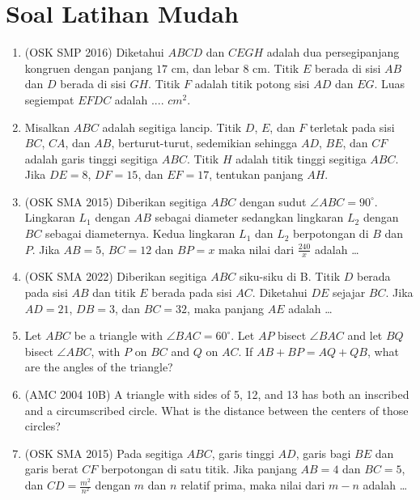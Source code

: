 \documentclass[11pt]{scrartcl}
\begin{document}
\section{Soal Latihan Mudah}
\begin{enumerate}
    \item (OSK SMP 2016) Diketahui $ABCD$ dan $CEGH$ adalah dua persegipanjang kongruen dengan panjang $17$ cm, dan lebar $8$ cm. Titik $E$ berada di sisi $AB$ dan $D$ berada di sisi $GH$. Titik $F$ adalah titik potong sisi $AD$ dan $EG$. Luas segiempat $EFDC$ adalah .... $cm^2$.

    \item Misalkan $ABC$ adalah segitiga lancip. Titik $D$, $E$, dan $F$ terletak pada sisi $BC$, $CA$, dan $AB$, berturut-turut, sedemikian sehingga $AD$, $BE$, dan $CF$ adalah garis tinggi segitiga $ABC$. Titik $H$ adalah titik tinggi segitiga $ABC$. Jika $DE = 8$, $DF = 15$, dan $EF = 17$, tentukan panjang $AH$.

    \item (OSK SMA 2015) Diberikan segitiga $ABC$ dengan sudut $\angle ABC = 90^\circ$. Lingkaran $L_1$ dengan $AB$ sebagai diameter sedangkan lingkaran $L_2$ dengan $BC$ sebagai diameternya. Kedua lingkaran $L_1$ dan $L_2$ berpotongan di $B$ dan $P$. Jika $AB = 5$, $BC = 12$ dan $BP = x$ maka nilai dari $\frac{240}{x}$ adalah \ldots

    \item (OSK SMA 2022) Diberikan segitiga $ABC$ siku-siku di B. Titik $D$ berada pada sisi $AB$ dan titik $E$ berada pada sisi $AC$. Diketahui $DE$ sejajar $BC$. Jika $AD = 21$, $DB = 3$, dan $BC = 32$, maka panjang $AE$ adalah \dots
    
    \item Let $ABC$ be a triangle with $\angle BAC = 60^\circ$. Let $AP$ bisect $\angle BAC$ and let $BQ$ bisect $\angle ABC$, with $P$ on $BC$ and $Q$ on $AC$. If $AB + BP = AQ + QB$, what are the angles of the triangle?

    \item (AMC 2004 10B) A triangle with sides of 5, 12, and 13 has both an inscribed and a circumscribed circle. What is the distance between the centers of those circles?

    \item (OSK SMA 2015) Pada segitiga $ABC$, garis tinggi $AD$, garis bagi $BE$ dan garis berat $CF$ berpotongan di satu titik. Jika panjang $AB = 4$ dan $BC = 5$, dan $CD = \frac{m^2}{n^2}$ dengan $m$ dan $n$ relatif prima, maka nilai dari $m - n$ adalah \ldots


\end{enumerate}
\end{document}
